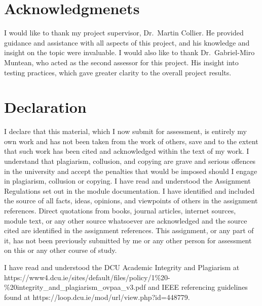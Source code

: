 \documentclass[11pt,a4paper]{scrreprt}
\begin{document}


\setcounter{secnumdepth}{1}
\setcounter{tocdepth}{1}
\tableofcontents
\listoftables
\listoffigures
\chapter{Acknowledgmenets}\label{acknowledgmenets}

I would like to thank my project supervisor, Dr.~Martin Collier. He
provided guidance and assistance with all aspects of this project, and
his knowledge and insight on the topic were invaluable. I would also
like to thank Dr.~Gabriel-Miro Muntean, who acted as the second assessor
for this project. His insight into testing practices, which gave greater
clarity to the overall project results.

\chapter{Declaration}\label{declaration}

I declare that this material, which I now submit for assessment, is
entirely my own work and has not been taken from the work of others,
save and to the extent that such work has been cited and acknowledged
within the text of my work. I understand that plagiarism, collusion, and
copying are grave and serious offences in the university and accept the
penalties that would be imposed should I engage in plagiarism, collusion
or copying. I have read and understood the Assignment Regulations set
out in the module documentation. I have identified and included the
source of all facts, ideas, opinions, and viewpoints of others in the
assignment references. Direct quotations from books, journal articles,
internet sources, module text, or any other source whatsoever are
acknowledged and the source cited are identified in the assignment
references. This assignment, or any part of it, has not been previously
submitted by me or any other person for assessment on this or any other
course of study.

I have read and understood the DCU Academic Integrity and Plagiarism at
https://www4.dcu.ie/sites/default/files/policy/1\%20-\%20integrity\_and\_plagiarism\hspace{0pt}\_ovpaa\_v3.pdf
and IEEE referencing guidelines found at
https://loop.dcu.ie/mod/url\hspace{0pt}/view.php?id=448779.
\end{document}
